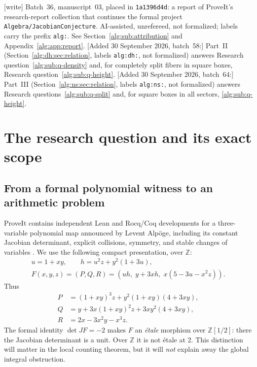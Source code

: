 \documentclass[11pt]{article}
\numberwithin{equation}{section}
\theoremstyle{plain}
\theoremstyle{plain}
\theoremstyle{plain}
\theoremstyle{definition}
\theoremstyle{definition}
\theoremstyle{definition}
\theoremstyle{remark}
\newcommand{\Z}{\mathbb Z}\newcommand{\Q}{\mathbb Q}
\newcommand{\wtag}{\textup{[write]}}%
\newcommand{\rpath}[1]{\nolinkurl{#1}}
\begin{document}
\begin{titlepage}
\smallskip
\noindent\wtag{} Batch~36, manuscript~03, placed in \texttt{1a1396d4d}: a
report of ProveIt's research-report collection that continues the formal
project \rpath{Algebra/JacobianConjecture}. AI-assisted, unrefereed, not
formalized; labels carry the prefix \texttt{alg:}. See
Section~\ref{alg:sub:attribution} and Appendix~\ref{alg:app:report}.
[Added 30 September 2026, batch~58:] Part~II
(Section~\ref{alg:dh:sec:relation}, labels \texttt{alg:dh:}, not
formalized) answers Research question~\ref{alg:sub:q-density} and, for
completely split fibers in square boxes, Research
question~\ref{alg:sub:q-height}.
[Added 30 September 2026, batch~64:] Part~III
(Section~\ref{alg:ns:sec:relation}, labels \texttt{alg:ns:}, not
formalized) answers Research questions~\ref{alg:sub:q-split} and, for
square boxes in all sectors, \ref{alg:sub:q-height}.
\end{titlepage}
\hypersetup{pageanchor=true}
\tableofcontents
\newpage

\section{The research question and its exact scope}\label{alg:sec:scope}

\subsection{From a formal polynomial witness to an arithmetic problem}
ProveIt contains independent Lean and Rocq/Coq developments for a
three-variable polynomial map announced by Levent Alp\"oge, including
its constant Jacobian determinant, explicit collisions, symmetry, and
stable changes of variables \cite{proveit,proveitresearch}. We use the
following compact presentation, over $\Z$:
\begin{equation}\label{alg:eq:F}
\begin{gathered}
 u=1+xy,\qquad h=u^2z+y^2(1+3u),\\
 F(x,y,z)=(P,Q,R)=(uh,\;y+3xh,\;x(5-3u-x^2z)).
\end{gathered}
\end{equation}
Thus
\begin{align*}
P&=(1+xy)^3z+y^2(1+xy)(4+3xy),\\
Q&=y+3x(1+xy)^2z+3xy^2(4+3xy),\\
R&=2x-3x^2y-x^3z.
\end{align*}
The formal identity $\det JF=-2$ makes $F$ an \emph{\'etale} morphism over
$\Z[1/2]$: there the Jacobian determinant is a unit. Over $\Z$ it is not
\'etale at $2$. This distinction will matter in the local counting theorem,
but it will \emph{not} explain away the global integral obstruction.
\end{document}
